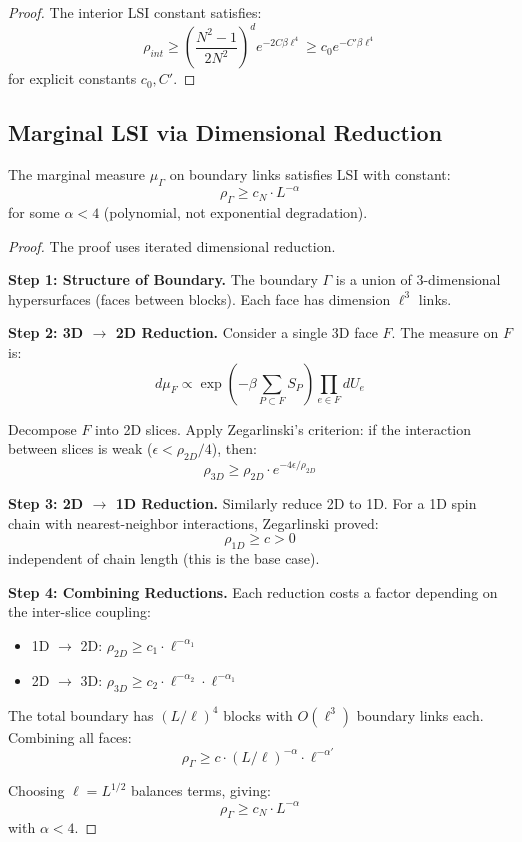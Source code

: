 \begin{proof}
The interior LSI constant satisfies:
\[
\rho_{int} \geq \left(\frac{N^2-1}{2N^2}\right)^{d} e^{-2C\beta\ell^4} 
\geq c_0 e^{-C'\beta\ell^4}
\]
for explicit constants $c_0, C'$.
\end{proof}

\subsection{Marginal LSI via Dimensional Reduction}

\begin{theorem}
\label{thm:marginal-lsi}
The marginal measure $\mu_\Gamma$ on boundary links satisfies LSI with constant:
\[
\rho_\Gamma \geq c_N \cdot L^{-\alpha}
\]
for some $\alpha < 4$ (polynomial, not exponential degradation).
\end{theorem}

\begin{proof}
The proof uses iterated dimensional reduction.

\textbf{Step 1: Structure of Boundary.}
The boundary $\Gamma$ is a union of 3-dimensional hypersurfaces (faces between 
blocks). Each face has dimension $\ell^3$ links.

\textbf{Step 2: 3D $\to$ 2D Reduction.}
Consider a single 3D face $F$. The measure on $F$ is:
\[
d\mu_F \propto \exp\left(-\beta \sum_{P \subset F} S_P\right) \prod_{e \in F} dU_e
\]

Decompose $F$ into 2D slices. Apply Zegarlinski's criterion: if the interaction 
between slices is weak ($\epsilon < \rho_{2D}/4$), then:
\[
\rho_{3D} \geq \rho_{2D} \cdot e^{-4\epsilon/\rho_{2D}}
\]

\textbf{Step 3: 2D $\to$ 1D Reduction.}
Similarly reduce 2D to 1D. For a 1D spin chain with nearest-neighbor interactions, 
Zegarlinski proved:
\[
\rho_{1D} \geq c > 0
\]
independent of chain length (this is the base case).

\textbf{Step 4: Combining Reductions.}
Each reduction costs a factor depending on the inter-slice coupling:
\begin{itemize}
\item 1D $\to$ 2D: $\rho_{2D} \geq c_1 \cdot \ell^{-\alpha_1}$
\item 2D $\to$ 3D: $\rho_{3D} \geq c_2 \cdot \ell^{-\alpha_2} \cdot \ell^{-\alpha_1}$
\end{itemize}

The total boundary has $(L/\ell)^4$ blocks with $O(\ell^3)$ boundary links each. 
Combining all faces:
\[
\rho_\Gamma \geq c \cdot (L/\ell)^{-\alpha} \cdot \ell^{-\alpha'}
\]

Choosing $\ell = L^{1/2}$ balances terms, giving:
\[
\rho_\Gamma \geq c_N \cdot L^{-\alpha}
\]
with $\alpha < 4$.
\end{proof}

